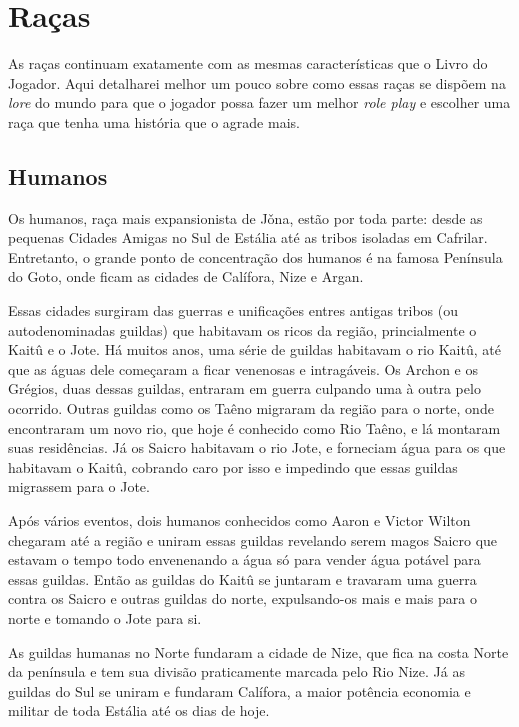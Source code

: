 \chapter{Raças}%
\label{cha:racas}
\begin{multicols}{2}

As raças continuam exatamente com as mesmas características que o Livro do
Jogador. Aqui detalharei melhor um pouco sobre como essas raças se dispõem na
\textit{lore} do mundo para que o jogador possa fazer um melhor \textit{role
play} e escolher uma raça que tenha uma história que o agrade mais.

\section{Humanos}%

Os humanos, raça mais expansionista de Jǒna, estão por toda parte: desde as
pequenas Cidades Amigas no Sul de Estália até as tribos isoladas em Cafrilar.
Entretanto, o grande ponto de concentração dos humanos é na famosa Península do
Goto, onde ficam as cidades de Calífora, Nize e Argan.

Essas cidades surgiram das guerras e unificações entres antigas tribos (ou
autodenominadas guildas) que habitavam os ricos da região, princialmente o
Kaitû e o Jote. Há muitos anos, uma série de guildas habitavam o rio Kaitû, até
que as águas dele começaram a ficar venenosas e intragáveis. Os Archon e os
Grégios, duas dessas guildas, entraram em guerra culpando uma à outra pelo
ocorrido. Outras guildas como os Taêno migraram da região para o norte, onde
encontraram um novo rio, que hoje é conhecido como Rio Taêno, e lá montaram suas
residências. Já os Saicro habitavam o rio Jote, e forneciam água para os que
habitavam o Kaitû, cobrando caro por isso e impedindo que essas guildas
migrassem para o Jote.

Após vários eventos, dois humanos conhecidos como Aaron e Victor Wilton chegaram
até a região e uniram essas guildas revelando serem magos Saicro que estavam o
tempo todo envenenando a água só para vender água potável para essas guildas.
Então as guildas do Kaitû se juntaram e travaram uma guerra contra os Saicro e
outras guildas do norte, expulsando-os mais e mais para o norte e tomando o Jote
para si.

As guildas humanas no Norte fundaram a cidade de Nize, que fica na costa Norte
da península e tem sua divisão praticamente marcada pelo Rio Nize. Já as guildas
do Sul se uniram e fundaram Calífora, a maior potência economia e militar de
toda Estália até os dias de hoje.



\end{multicols}
